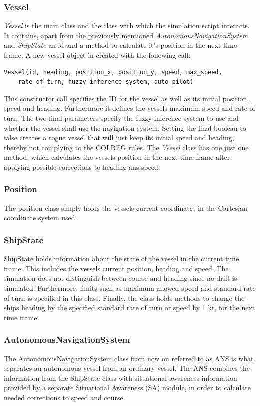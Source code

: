 \subsubsection{Vessel}
\textit{Vessel} is the main class and the class with which the simulation script interacts.
It contains, apart from the previously mentioned \textit{AutonomousNavigationSystem} and \textit{ShipState} an id and a method to calculate it's position in the next time frame.
A new vessel object in created with the following call:
\begin{verbatim}
Vessel(id, heading, position_x, position_y, speed, max_speed, 
    rate_of_turn, fuzzy_inference_system, auto_pilot)
\end{verbatim}
This constructor call specifies the ID for the vessel as well as its initial position, speed and heading. Furthermore it defines the vessels maximum speed and rate of turn. The two final parameters specify the fuzzy inference system to use and whether the vessel shall use the navigation system. Setting the final boolean to false creates a rogue vessel that will just keep its initial speed and heading, thereby not complying to the COLREG rules. The \textit{Vessel} class has one just one method, which calculates the vessels position in the next time frame after applying possible corrections to heading ans speed.
\subsubsection{Position}
The position class simply holds the vessels current coordinates in the Cartesian coordinate system used.
\subsubsection{ShipState}
ShipState holds information about the state of the vessel in the current time frame. This includes the vessels current position, heading and speed. The simulation does not distinguish between course and heading since no drift is simulated.
Furthermore, limits such as maximum allowed speed and standard rate of turn is specified in this class. Finally, the class holds methods to change the ships heading by the specified standard rate of turn or speed by 1 kt, for the next time frame.


\subsubsection{AutonomousNavigationSystem}
The AutonomousNavigationSystem class from now on referred to as ANS is what separates an autonomous vessel from an ordinary vessel. The ANS combines the information from the ShipState class with situational awareness information provided by a separate Situational Awareness (SA) module, in order to calculate needed corrections to speed and course.

